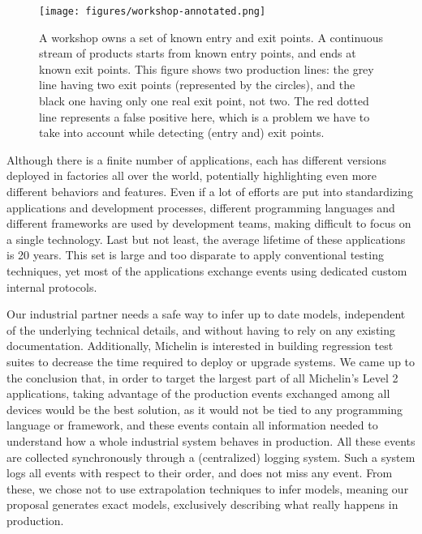 \begin{figure}[ht]
    \begin{center}
        \texttt{[image: figures/workshop-annotated.png]}
    \end{center}

    \caption{A workshop owns a set of known entry and exit
    points. A continuous stream of products starts from known
    entry points, and ends at known exit points. This figure
    shows two production lines: the grey line having two exit
    points (represented by the circles), and the black one having
    only one real exit point, not two. The red dotted line
    represents a false positive here, which is a problem we have
    to take into account while detecting (entry and) exit
    points.}
    \label{fig:workshop-annotated}
\end{figure}

Although there is a finite number of applications, each has
different versions deployed in factories all over the world,
potentially highlighting even more different behaviors and
features. Even if a lot of efforts are put into standardizing
applications and development processes, different programming
languages and different frameworks are used by development
teams, making difficult to focus on a single technology. Last
but not least, the average lifetime of these applications is 20
years. This set is large and too disparate to apply conventional
testing techniques, yet most of the applications exchange events
using dedicated custom internal protocols.

Our industrial partner needs a safe way to infer up to date
models, independent of the underlying technical details, and
without having to rely on any existing documentation.
Additionally, Michelin is interested in building regression test
suites to decrease the time required to deploy or upgrade
systems. We came up to the conclusion that, in order to target
the largest part of all Michelin's Level 2 applications, taking
advantage of the production events exchanged among all devices
would be the best solution, as it would not be tied to any
programming language or framework, and these events contain all
information needed to understand how a whole industrial system
behaves in production. All these events are collected
synchronously through a (centralized) logging system. Such a
system logs all events with respect to their order, and does not
miss any event.  From these, we chose not to use extrapolation
techniques to infer models, meaning our proposal generates
exact models, exclusively describing what really happens
in production.

